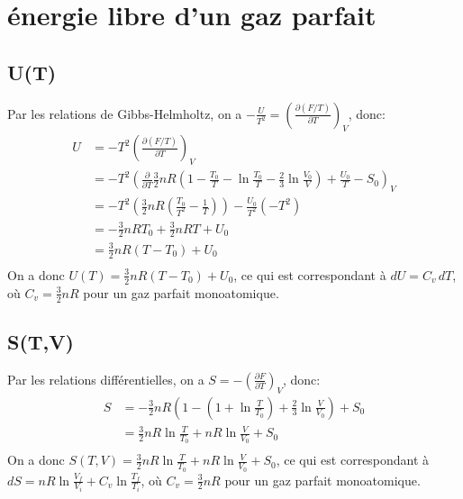 \documentclass[a4paper,12pt]{book}
\begin{document}
\renewcommand{\labelitemi}{$\blacktriangleright$}
\renewcommand{\labelitemii}{$\bullet$}


\section{énergie libre d’un gaz parfait}
\subsection{U(T)}
Par les relations de Gibbs-Helmholtz, on a $-\frac{U}{T^2}=\left(\frac{\partial (F/T)}
{\partial T}\right)_V$, donc:
\begin{align*}
U&=-T^2\left(\frac{\partial (F/T)}{\partial T}\right)_V\\
 &=-T^2\left(\frac{\partial}{\partial T}\frac{3}{2}nR\left(1-\frac{T_0}{T}-\ln\frac{T_0}{T}
 -\frac{2}{3}\ln\frac{V_0}{V}\right)+\frac{U_0}{T}-S_0\right)_V\\
 &=-T^2\left(\frac{3}{2}nR\left(\frac{T_0}{T^2}-\frac{1}{T}\right)\right)-\frac{U_0}{T^2}(-T^2)\\
 &=-\frac{3}{2}nRT_0+\frac{3}{2}nRT+U_0\\
 &=\frac{3}{2}nR(T-T_0)+U_0\\
\end{align*}
On a donc $\boxed{U(T)=\frac{3}{2}nR(T-T_0)+U_0}$, ce qui est correspondant à $dU=C_v\,dT$, où $C_v=
\frac{3}{2}nR$ pour un gaz parfait monoatomique.

\subsection{S(T,V)}
Par les relations différentielles, on a $S=-\left(\frac{\partial F}{\partial T}\right)_V$, donc:
\begin{align*}
S&=-\frac{3}{2}nR\left(1-\left(1+\ln\frac{T}{T_0}\right)+\frac{2}{3}\ln\frac{V}{V_0}\right)+S_0\\
 &=\frac{3}{2}nR\ln\frac{T}{T_0}+nR\ln\frac{V}{V_0}+S_0\\
\end{align*}
On a donc $\boxed{S(T,V)=\frac{3}{2}nR\ln\frac{T}{T_0}+nR\ln\frac{V}{V_0}+S_0}$, ce qui est 
correspondant à $dS=nR\ln\frac{V_f}{V_i}+C_v\ln\frac{T_f}{T_i}$, où $C_v=
\frac{3}{2}nR$ pour un gaz parfait monoatomique.
\end{document}
